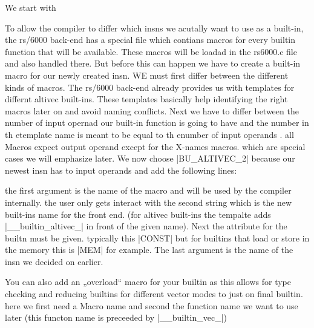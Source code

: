 We start with






To allow the compiler to differ which insns we acutally want to use as a built-in, the rs/6000 back-end has a special file which contians macros for every builtin function that will be available.
These  macros will be loadad in the rs6000.c file and also handled there.
But before this can happen we have to create a built-in macro for our newly created insn.
WE must first differ between the different kinds of macros.
The rs/6000 back-end already provides us with templates for differnt altivec built-ins.
These templates basically help identifying the right macros later on and avoid naming conflicts.
Next we have to differ between the number of input opernad our built-in function is going to have and the number  in th etemplate name is meant to be equal to th enumber of input operands .
all Macros expect output operand except for the X-names macros.
which are special cases we will emphasize later.
We now choose |BU_ALTIVEC_2| because our newest insn has to input operands and add the following lines:

the first argument is the name of the macro and will be used by the compiler internally.
the user only gets interact with the second string which is the new built-ins name for the front end.
(for altivec built-ins the tempalte adds |__builtin_altivec_| in front of the given name).
Next the attribute for the builtn must be given.
typically this |CONST| but for builtins that load or store in the memory this is |MEM| for example.
The last argument is the name of the insn we decided on earlier.

You can also add an „overload“ macro for your builtin as this allows for type checking and reducing builtins for different vector modes to just on final builtin.
here we first need a Macro name and second the function name we want to use later (this functon name is preceeded by |__builtin_vec_|)


